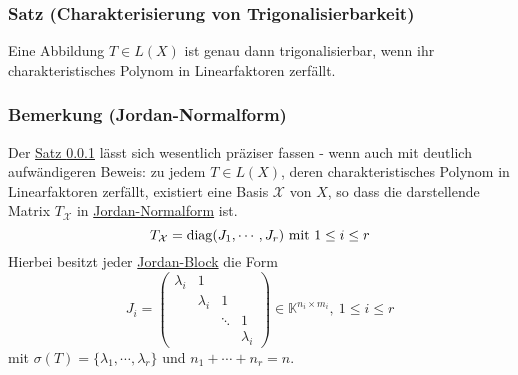 \subsubsection{Satz (Charakterisierung von Trigonalisierbarkeit)}
\label{4.4.5}
Eine Abbildung $T\in L(X)$ ist genau dann trigonalisierbar, wenn ihr charakteristisches Polynom in Linearfaktoren zerfällt.
\subsubsection{Bemerkung (Jordan-Normalform)}
Der \hyperref[4.4.5]{Satz \ref{4.4.5}} lässt sich wesentlich präziser fassen - wenn auch mit deutlich aufwändigeren Beweis: zu jedem $T\in L(X)$, deren charakteristisches Polynom in Linearfaktoren zerfällt, existiert eine Basis $\mathcal{X}$ von $X$, so dass die darstellende Matrix $T_\mathcal{X}$ in \underline{Jordan-Normalform} ist.
\[T_\mathcal{X}=\operatorname{diag}(J_1,\cdots ,J_r)\text{ mit } 1\leq i\leq r\]
Hierbei besitzt jeder \underline{Jordan-Block} die Form 
\[J_i=\begin{pmatrix}\lambda _i & 1\\ & \lambda _i & 1 \\& & \ddots & 1\\ & & & \lambda _i\end{pmatrix}\in\mathbb{K}^{n_i\times m_i},\ 1\leq i\leq r\]
mit $\sigma (T) = \{\lambda _1,\cdots ,\lambda _r\}$ und $n_1+\cdots +n_r=n$.
